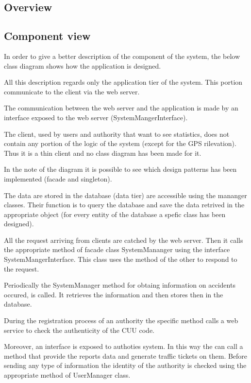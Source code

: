 \subsection{Overview}

\subsection{Component view}
In order to give a better description of the component of the system, the below class diagram shows how the application is designed.

All this description regards only the application tier of the system. This portion communicate to the client via the web server.

 The communication between the web server and the application is made by an interface exposed to the web server (SystemMangerInterface).
 
The client, used by users and authority that want to see statistics, does not contain any portion of the logic of the system (except for the GPS rilevation). Thus it is a thin client and no class diagram has been made for it.

In the note of the diagram it is possible to see which design patterns has been implemented (facade and singleton).

The data are stored in the database (data tier) are accessible using the mananger classes. Their function is to query the database and save the data retrived in the appropriate object (for every entity of the database a spefic class has been designed).

All the request arriving from clients are catched by the web server. Then it calls the appropriate method of facade class SystemMananger using the interface SystemMangerInterface. This class uses the method of the other to respond to the request.

Periodically the SystemManager method for obtaing information on accidents occured, is called. It retrieves the information and then stores then in the database.

During the registration process of an authority the specific method calls a web service to check the authenticity of the CUU code.

Moreover, an interface is exposed to authoties system. In this way the can call a method that provide the reports data and generate traffic tickets on them. Before sending any type of information the identity of the authority is checked using the appropriate method of UserManager class.

